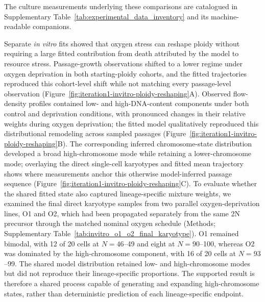 \documentclass[11pt]{article}
\begin{document}
The culture measurements underlying these comparisons are catalogued in Supplementary Table~\ref{tab:experimental_data_inventory} and its machine-readable companions.

Separate \textit{in vitro} fits showed that oxygen stress can reshape ploidy without requiring a large fitted contribution from death attributed by the model to resource stress. Passage-growth observations shifted to a lower regime under oxygen deprivation in both starting-ploidy cohorts, and the fitted trajectories reproduced this cohort-level shift while not matching every passage-level observation (Figure~\ref{fig:iteration1-invitro-ploidy-reshaping}A). Observed flow-density profiles contained low- and high-DNA-content components under both control and deprivation conditions, with pronounced changes in their relative weights during oxygen deprivation; the fitted model qualitatively reproduced this distributional remodeling across sampled passages (Figure~\ref{fig:iteration1-invitro-ploidy-reshaping}B). The corresponding inferred chromosome-state distribution developed a broad high-chromosome mode while retaining a lower-chromosome mode; overlaying the direct single-cell karyotypes and fitted mean trajectory shows where measurements anchor this otherwise model-inferred passage sequence (Figure~\ref{fig:iteration1-invitro-ploidy-reshaping}C). To evaluate whether the shared fitted state also captured lineage-specific mixture weights, we examined the final direct karyotype samples from two parallel oxygen-deprivation lines, O1 and O2, which had been propagated separately from the same 2N precursor through the matched nominal oxygen schedule (Methods; Supplementary Table~\ref{tab:invitro_o1_o2_final_karyotype}). O1 remained bimodal, with 12 of 20 cells at \(N=46\)--49 and eight at \(N=90\)--100, whereas O2 was dominated by the high-chromosome component, with 16 of 20 cells at \(N=93\)--99. The shared model distribution retained low- and high-chromosome modes but did not reproduce their lineage-specific proportions. The supported result is therefore a shared process capable of generating and expanding high-chromosome states, rather than deterministic prediction of each lineage-specific endpoint.
\end{document}
